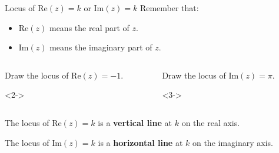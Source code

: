 \documentclass[8pt]{beamer}
\begin{document}
\begin{frame}{Locus of $\text{Re}(z)=k$ or $\text{Im}(z)=k$}
	Remember that:
	\begin{itemize}
		\item $\text{Re}(z)$ means the real part of $z$.
		\item  $\text{Im}(z)$ means the imaginary part of $z$.
	\end{itemize}


	\begin{columns}
	\begin{column}{.5\linewidth}
	\begin{problem}
		Draw the locus of $\text{Re}(z)=-1$.
	\end{problem}
	\begin{solution}<2->
	\begin{center}
\end{center}
	\end{solution}
	\end{column}
	\begin{column}{.5\linewidth}
	\begin{problem}
		Draw the locus of $\text{Im}(z)=\pi$.
	\end{problem}
	\begin{solution}<3->
		

	\begin{center}
\end{center}
	\end{solution}
	\end{column}
	\end{columns}

\begin{definition}
	The locus of $\text{Re}(z)=k$ is a \textbf{vertical line} at $k$ on the real axis.

	The locus of  $\text{Im}(z)=k$ is a \textbf{horizontal line} at $k$ on the imaginary axis. 
\end{definition}
\end{frame}
\end{document}
